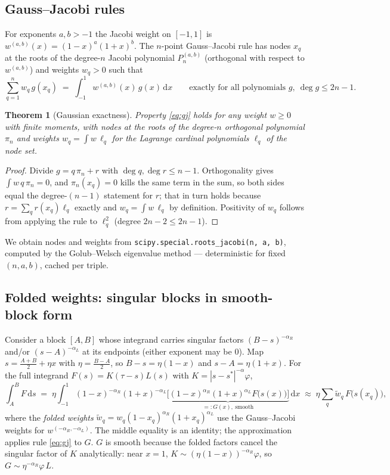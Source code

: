 \documentclass[11pt]{article}
\newcommand{\dd}{\,\mathrm{d}}
\newcommand{\kw}[1]{\texttt{#1}}
\newtheorem{theorem}{Theorem}
\begin{document}
\subsection{Gauss--Jacobi rules}
For exponents $a,b>-1$ the Jacobi weight on $[-1,1]$ is
$w^{(a,b)}(x)=(1-x)^a(1+x)^b$. The $n$-point Gauss--Jacobi rule has nodes
$x_q$ at the roots of the degree-$n$ Jacobi polynomial $P_n^{(a,b)}$
(orthogonal with respect to $w^{(a,b)}$) and weights $w_q>0$ such that
\begin{equation}
  \sum_{q=1}^{n} w_q\, g(x_q) \;=\; \int_{-1}^{1} w^{(a,b)}(x)\, g(x)\dd x
  \qquad\text{exactly for all polynomials } g,\ \deg g \le 2n-1.
  \label{eq:gj}
\end{equation}

\begin{theorem}[Gaussian exactness]\label{thm:exact}
Property \eqref{eq:gj} holds for any weight $w\ge0$ with finite moments,
with nodes at the roots of the degree-$n$ orthogonal polynomial $\pi_n$
and weights $w_q = \int w\,\ell_q$ for the Lagrange cardinal polynomials
$\ell_q$ of the node set.
\end{theorem}
\begin{proof}
Divide $g = q\,\pi_n + r$ with $\deg q,\deg r\le n-1$. Orthogonality gives
$\int w\,q\,\pi_n = 0$, and $\pi_n(x_q)=0$ kills the same term in the sum,
so both sides equal the degree-$(n-1)$ statement for $r$; that in turn
holds because $r=\sum_q r(x_q)\ell_q$ exactly and $w_q=\int w\,\ell_q$ by
definition. Positivity of $w_q$ follows from applying the rule to
$\ell_q^2$ (degree $2n-2\le 2n-1$).
\end{proof}

We obtain nodes and weights from \kw{scipy.special.roots\_jacobi(n, a, b)},
computed by the Golub--Welsch eigenvalue method --- deterministic for fixed
$(n,a,b)$, cached per triple.

\subsection{Folded weights: singular blocks in smooth-block form}
\label{sec:folded}
Consider a block $[A,B]$ whose integrand carries singular factors
$(B-s)^{-\alpha_R}$ and/or $(s-A)^{-\alpha_L}$ at its endpoints (either
exponent may be $0$). Map $s = \tfrac{A+B}{2} + \eta x$ with
$\eta=\tfrac{B-A}{2}$, so $B-s=\eta(1-x)$ and $s-A=\eta(1+x)$. For the
full integrand $F(s)=K(\tau-s)L(s)$ with
$K = |s-s^\ast|^{-\alpha}\varphi$,
\begin{equation}
  \int_A^B F \dd s
  \;=\; \eta \int_{-1}^{1} (1-x)^{-\alpha_R}(1+x)^{-\alpha_L}
  \underbrace{\bigl[(1-x)^{\alpha_R}(1+x)^{\alpha_L}
  F\bigl(s(x)\bigr)\bigr]}_{=:G(x),\ \text{smooth}}\dd x
  \;\approx\; \eta \sum_q \widetilde w_q\, F\bigl(s(x_q)\bigr),
  \label{eq:folded}
\end{equation}
where the \emph{folded weights}
$\widetilde w_q = w_q (1-x_q)^{\alpha_R}(1+x_q)^{\alpha_L}$ use the
Gauss--Jacobi weights for $w^{(-\alpha_R,-\alpha_L)}$. The middle equality
is an identity; the approximation applies rule \eqref{eq:gj} to $G$.
$G$ is smooth because the folded factors cancel the singular factor of $K$
analytically: near $x=1$,
$K \sim (\eta(1-x))^{-\alpha_R}\varphi$, so
$G \sim \eta^{-\alpha_R}\varphi\,L$.
\end{document}
